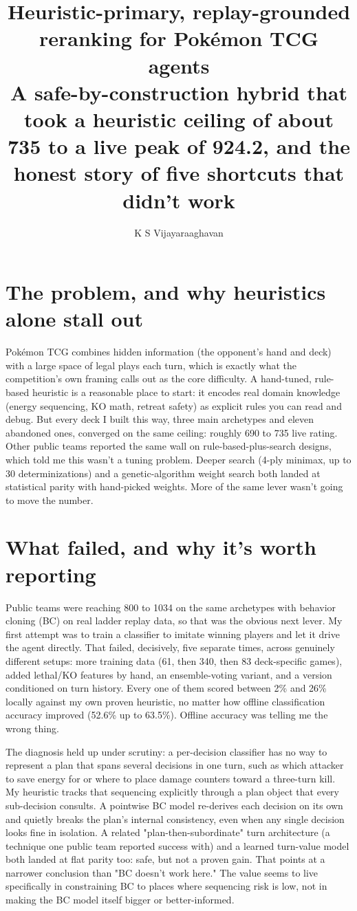 \documentclass[11pt]{article}
\title{\textbf{Heuristic-primary, replay-grounded reranking for Pok\'emon TCG agents}\\[4pt]
\large A safe-by-construction hybrid that took a heuristic ceiling of about 735 to a live peak of 924.2, and the honest story of five shortcuts that didn't work}
\author{K S Vijayaraaghavan}
\date{}
\begin{document}
\maketitle

\section*{The problem, and why heuristics alone stall out}

Pok\'emon TCG combines hidden information (the opponent's hand and deck) with a large space of legal plays each turn, which is exactly what the competition's own framing calls out as the core difficulty. A hand-tuned, rule-based heuristic is a reasonable place to start: it encodes real domain knowledge (energy sequencing, KO math, retreat safety) as explicit rules you can read and debug. But every deck I built this way, three main archetypes and eleven abandoned ones, converged on the same ceiling: roughly 690 to 735 live rating. Other public teams reported the same wall on rule-based-plus-search designs, which told me this wasn't a tuning problem. Deeper search (4-ply minimax, up to 30 determinizations) and a genetic-algorithm weight search both landed at statistical parity with hand-picked weights. More of the same lever wasn't going to move the number.

\section*{What failed, and why it's worth reporting}

Public teams were reaching 800 to 1034 on the same archetypes with behavior cloning (BC) on real ladder replay data, so that was the obvious next lever. My first attempt was to train a classifier to imitate winning players and let it drive the agent directly. That failed, decisively, five separate times, across genuinely different setups: more training data (61, then 340, then 83 deck-specific games), added lethal/KO features by hand, an ensemble-voting variant, and a version conditioned on turn history. Every one of them scored between 2\% and 26\% locally against my own proven heuristic, no matter how offline classification accuracy improved (52.6\% up to 63.5\%). Offline accuracy was telling me the wrong thing.

The diagnosis held up under scrutiny: a per-decision classifier has no way to represent a plan that spans several decisions in one turn, such as which attacker to save energy for or where to place damage counters toward a three-turn kill. My heuristic tracks that sequencing explicitly through a plan object that every sub-decision consults. A pointwise BC model re-derives each decision on its own and quietly breaks the plan's internal consistency, even when any single decision looks fine in isolation. A related "plan-then-subordinate" turn architecture (a technique one public team reported success with) and a learned turn-value model both landed at flat parity too: safe, but not a proven gain. That points at a narrower conclusion than "BC doesn't work here." The value seems to live specifically in constraining BC to places where sequencing risk is low, not in making the BC model itself bigger or better-informed.
\end{document}
